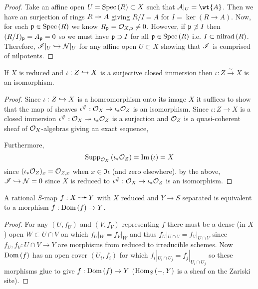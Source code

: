 \documentclass[12pt]{article}
\begin{document}
\begin{proof}
Take an affine open $U = \mathrm{Spec}\left( R \right) \subset X$ such that $\mathcal{A} |_{U} = \wt{A}$. Then we have an surjection of rings $R \twoheadrightarrow A$ giving $R/I = A$ for $I = \ker{(R \to A)}$. Now, for each $\mathfrak{p} \in \mathrm{Spec}\left( R \right)$ we know $R_{\mathfrak{p}} = \mathcal{O}_{X, \mathfrak{p}} \neq 0$. However, if $\mathfrak{p} \not\supset I$ then $(R/I)_{\mathfrak{p}} = A_{\mathfrak{p}} = 0$ so we must have $\mathfrak{p} \supset I$ for all $\mathfrak{p} \in \mathrm{Spec}\left( R \right)$ i.e. $I \subset \mathrm{nilrad}\left( R \right)$. Therefore, $\mathscr{I} |_U \hookrightarrow \mathcal{N}|_U$ for any affine open $U \subset X$ showing that $\mathscr{I}$ is comprised of nilpotents. 
\end{proof}

\begin{corollary}
If $X$ is reduced and $\iota : Z \hookrightarrow X$ is a surjective closed immersion then $\iota : Z \xrightarrow{\sim} X$ is an isomorphism. 
\end{corollary}

\begin{proof}
Since $\iota: Z \hookrightarrow X$ is a homeomorphism onto its image $X$ it suffices to show that the map of sheaves $\iota^\# : \mathcal{O}_{X} \to \iota_* \mathcal{O}_{Z}$ is an isomorphism. Since $\iota : Z \to X$ is a closed immersion $\iota^\# : \mathcal{O}_{X} \twoheadrightarrow \iota_* \mathcal{O}_{Z}$ is a surjection and $\mathcal{O}_{Z}$ is a quasi-coherent sheaf of $\mathcal{O}_{X}$-algebras giving an exact sequence,
\begin{center}
\end{center} Furthermore, 
\[ \mathrm{Supp}_{\mathcal{O}_{X}}\left(\iota_* \mathcal{O}_{Z} \right) = \mathrm{Im}\left( \iota \right) = X \]
since $(\iota_* \mathcal{O}_{Z})_x = \mathcal{O}_{Z, x}$ when $x \in \Im{\iota}$ (and zero elsewhere). by the above, $\mathscr{I} \hookrightarrow \mathcal{N} = 0$ since $X$ is reduced to $\iota^\# : \mathcal{O}_{X} \to \iota_* \mathcal{O}_{Z}$ is an isomorphism.  
\end{proof}

\begin{lemma}
A rational $S$-map $f : X \rat Y$ with $X$ reduced and $Y \to S$ separated is equivalent to a morphism $f : \mathrm{Dom}\left(f \right) \to Y$. 
\end{lemma}

\begin{proof}
For any $(U, f_U)$ and $(V, f_V)$ representing $f$ there must be a dense (in $X$) open $W \subset U \cap V$ on which $f_U|_W = f_V|_W$ and thus $f_U |_{U \cap V} = f_V |_{U \cap V}$ since $f_U, f_V : U \cap V \to Y$ are morphisms from reduced to irreducible schemes. Now $\mathrm{Dom}\left(f \right)$ has an open cover $(U_i, f_i)$ for which $f_i |_{U_i \cap U_j} = f_j |_{U_i \cap U_j}$ so these morphisms glue to give $f : \mathrm{Dom}\left(f \right) \to Y$ ($\mathrm{Hom}_{S} \left( -, Y \right)$ is a sheaf on the Zariski site).  
\end{proof}
\end{document}
